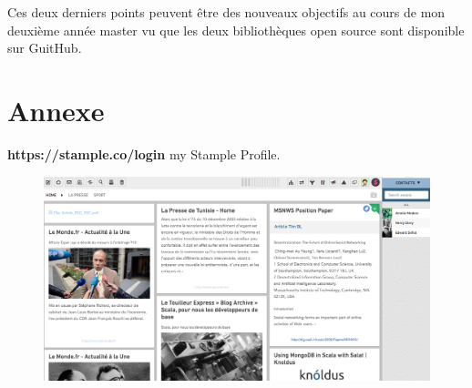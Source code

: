 \documentclass[11pt]{article} %
\begin{document}
Ces deux derniers points peuvent être des nouveaux objectifs au cours de mon deuxième année master vu que les deux bibliothèques open source sont disponible sur GuitHub.  

\newpage
\section{Annexe}

\textbf{https://stample.co/login} my Stample Profile.
\begin{figure}[H]
        \centering
                \centering
                \includegraphics[width=\textwidth]{Stample.png}
		\caption{}

               
\end{figure}
\end{document}
